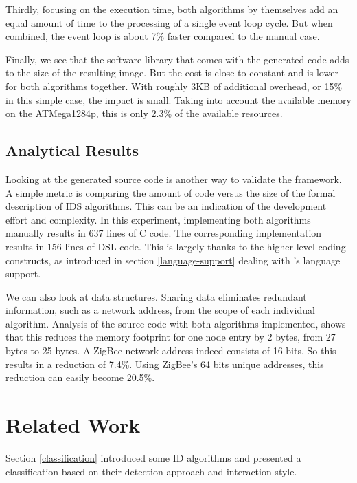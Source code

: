 \documentclass[conference]{IEEEtran}
\begin{document}
Thirdly, focusing on the execution time, both algorithms by themselves add an
equal amount of time to the processing of a single event loop cycle. But when
combined, the event loop is about 7\% faster compared to the manual case.

Finally, we see that the software library that comes with the generated code
adds to the size of the resulting image. But the cost is close to constant and
is lower for both algorithms together. With roughly 3KB of additional overhead,
or 15\% in this simple case, the impact is small. Taking into account the
available memory on the ATMega1284p, this is only 2.3\% of the available
resources.

\subsection{Analytical Results}

Looking at the generated source code is another way to validate the framework.
A simple metric is comparing the amount of code versus the size of the formal
description of IDS algorithms. This can be an indication of the development
effort and complexity. In this experiment, implementing both algorithms
manually results in 637 lines of C code. The corresponding \NAME implementation
results in 156 lines of DSL code. This is largely thanks to the higher level
coding constructs, as introduced in section \ref{language-support} dealing with
\NAME's language support.

We can also look at data structures. Sharing data eliminates redundant
information, such as a network address, from the scope of each individual
algorithm. Analysis of the source code with both algorithms implemented, shows
that this reduces the memory footprint for one node entry by 2 bytes, from 27
bytes to 25 bytes. A ZigBee network address indeed consists of 16 bits. So this
results in a reduction of 7.4\%. Using ZigBee's 64 bits unique addresses, this
reduction can easily become 20.5\%.

\section{Related Work}
\label{related}

Section \ref{classification} introduced some ID algorithms
\cite{ganeriwal2008reputation,mishra2004intrusion,krontiris2009cooperative} and
presented a classification
\cite{mishra2004intrusion,ioannis2007towards,alrajeh2013intrusion} based on
their detection approach and interaction style.
\end{document}
